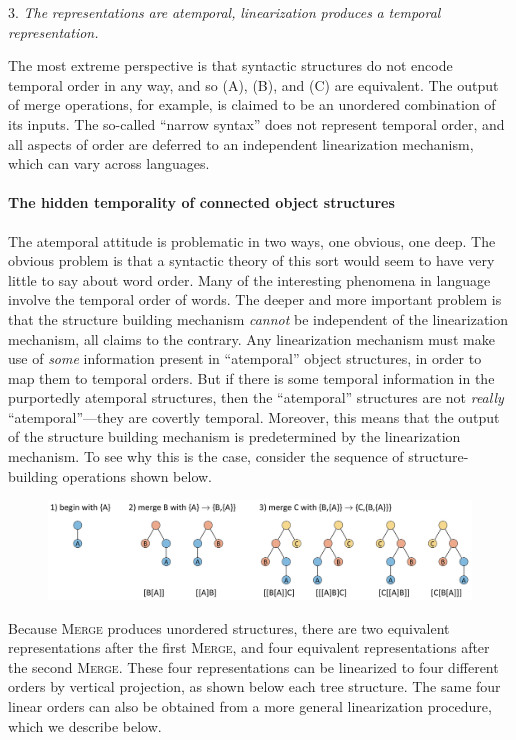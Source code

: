 3. \textit{The} \textit{representations} \textit{are} \textit{atemporal,} \textit{linearization} \textit{produces} \textit{a} \textit{temporal} \textit{representation.}

  The most extreme perspective is that syntactic structures do not encode temporal order in any way, and so (A), (B), and (C) are equivalent. The output of merge operations, for example, is claimed to be an unordered combination of its inputs. The so-called “narrow syntax” does not represent temporal order, and all aspects of order are deferred to an independent linearization mechanism, which can vary across languages. 

\paragraph{The hidden temporality of connected object structures}

The atemporal attitude is problematic in two ways, one obvious, one deep. The obvious problem is that a syntactic theory of this sort would seem to have very little to say about word order. Many of the interesting phenomena in language involve the temporal order of words. The deeper and more important problem is that the structure building mechanism \textit{cannot} be independent of the linearization mechanism, all claims to the contrary. Any linearization mechanism must make use of \textit{some} information present in “atemporal” object structures, in order to map them to temporal orders. But if there is some temporal information in the purportedly atemporal structures, then the “atemporal” structures are not \textit{really} “atemporal”—they are covertly temporal. Moreover, this means that the output of the structure building mechanism is predetermined by the linearization mechanism. To see why this is the  case, consider the sequence of structure-building operations shown below.

  
\begin{figure}
\includegraphics[width=\textwidth]{figures/Tilsen-img42.png}
\caption{\missingcaption}
\label{fig:}
\end{figure}
 

  Because \textsc{Merge} produces unordered structures, there are two equivalent representations after the first \textsc{Merge}, and four equivalent representations after the second \textsc{Merge}. These four representations can be linearized to four different orders by vertical projection, as shown below each tree structure. The same four linear orders can also be obtained from a more general linearization procedure, which we describe below.

